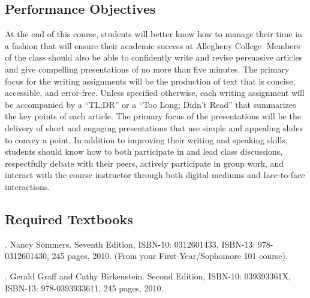 \subsection*{Performance Objectives}

At the end of this course, students will better know how to manage their time in a fashion that will ensure their
academic success at Allegheny College. Members of the class should also be able to confidently write and revise
persuasive articles and give compelling presentations of no more than five minutes. The primary focus for the writing
assignments will be the production of text that is concise, accessible, and error-free. Unless specified otherwise, each
writing assignment will be accompanied by a ``TL;DR'' or a ``Too Long; Didn't Read'' that summarizes the key points of
each article. The primary focus of the presentations will be the delivery of short and engaging presentations that use
simple and appealing slides to convey a point. In addition to improving their writing and speaking skills, students
should know how to both participate in and lead class discussions, respectfully debate with their peers, actively
participate in group work, and interact with the course instructor through both digital mediums and face-to-face
interactions.

\subsection*{Required Textbooks}


. Nancy Sommers. Seventh Edition, ISBN-10: 0312601433, ISBN-13: 978-0312601430,
245 pages, 2010. (From your First-Year/Sophomore 101 course).


. Gerald Graff and Cathy Birkenstein. Second Edition,
ISBN-10: 039393361X, ISBN-13: 978-0393933611, 245 pages, 2010.


